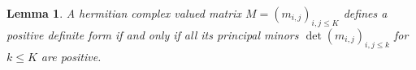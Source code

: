 \documentclass[a4paper,12pt, reqn0]{amsart}
\newtheorem{lemma}{Lemma}[section]
\theoremstyle{remark}
\newcommand{\Mcal}{\mathcal{M}}
\begin{document}
\begin{lemma}\label{Additive}
  A hermitian complex valued matrix $M=(m_{i,j})_{i,j\le K}$ defines a
  positive definite form if and only if
  all its principal minors
 $
   \det(m_{i,j})_{i,j\le k}
  $ for $k\le K$
  are positive.
\end{lemma}
\end{document}
